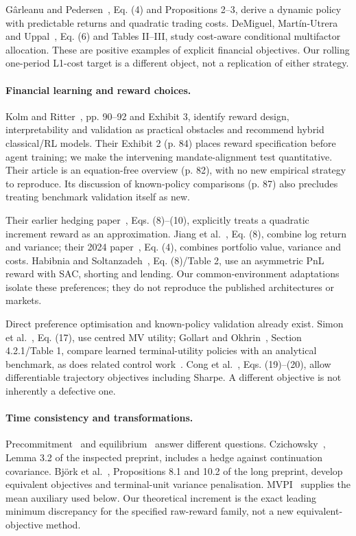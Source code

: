 \documentclass[sigconf,anonymous,review]{acmart}
\begin{document}
G\^arleanu and Pedersen~\cite{garleanu2013}, Eq. (4) and Propositions 2--3, derive a dynamic policy with predictable returns and quadratic trading costs. DeMiguel, Mart\'in-Utrera and Uppal~\cite{demiguel2024}, Eq. (6) and Tables II--III, study cost-aware conditional multifactor allocation. These are positive examples of explicit financial objectives. Our rolling one-period L1-cost target is a different object, not a replication of either strategy.

\paragraph{Financial learning and reward choices.}
Kolm and Ritter~\cite{kolm2025}, pp. 90--92 and Exhibit 3, identify reward design, interpretability and validation as practical obstacles and recommend hybrid classical/RL models. Their Exhibit 2 (p. 84) places reward specification before agent training; we make the intervening mandate-alignment test quantitative. Their article is an equation-free overview (p. 82), with no new empirical strategy to reproduce. Its discussion of known-policy comparisons (p. 87) also precludes treating benchmark validation itself as new.

Their earlier hedging paper~\cite{kolm2019}, Eqs. (8)--(10), explicitly treats a quadratic increment reward as an approximation. Jiang et al.~\cite{jiang2025}, Eq. (8), combine log return and variance; their 2024 paper~\cite{jiang2024}, Eq. (4), combines portfolio value, variance and costs. Habibnia and Soltanzadeh~\cite{habibnia2024}, Eq. (8)/Table 2, use an asymmetric PnL reward with SAC, shorting and lending. Our common-environment adaptations isolate these preferences; they do not reproduce the published architectures or markets.

Direct preference optimisation and known-policy validation already exist. Simon et al.~\cite{simon2026}, Eq. (17), use centred MV utility; Gollart and Okhrin~\cite{gollart2025}, Section 4.2.1/Table 1, compare learned terminal-utility policies with an analytical benchmark, as does related control work~\cite{chaouki2020}. Cong et al.~\cite{cong2026}, Eqs. (19)--(20), allow differentiable trajectory objectives including Sharpe. A different objective is not inherently a defective one.

\paragraph{Time consistency and transformations.}
Precommitment~\cite{ling2000} and equilibrium~\cite{basak2010,dai2023} answer different questions. Czichowsky~\cite{czichowsky2013}, Lemma 3.2 of the inspected preprint, includes a hedge against continuation covariance. Bj\"ork et al.~\cite{bkm2016}, Propositions 8.1 and 10.2 of the long preprint, develop equivalent objectives and terminal-unit variance penalisation. MVPI~\cite{zhang2021} supplies the mean auxiliary used below. Our theoretical increment is the exact leading minimum discrepancy for the specified raw-reward family, not a new equivalent-objective method.
\end{document}
